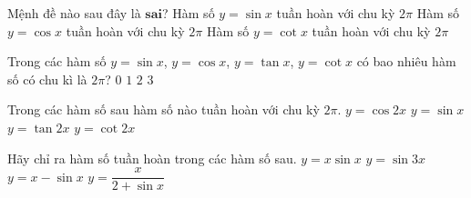 

\begin{ex}%
	Mệnh đề nào sau  đây là $\textbf{sai}$?
		{Hàm số $y=\sin x$  tuần hoàn với chu kỳ $2\pi$}
		{Hàm số  $y=\cos x$ tuần hoàn với chu kỳ $2\pi$}
		 {\True Hàm số $y=\cot x$ tuần hoàn với chu kỳ $2\pi$}
\end{ex}

\begin{ex}%
	Trong các hàm số $y=\sin x$, $y=\cos x$, $y=\tan x$, $y=\cot x$ có bao  nhiêu hàm số có chu kì là $2\pi$?
	\choice 
		 {$0$}
		{$1$} 
		{\True  $2$}
		{$3$} 
\end{ex}

\begin{ex}%
	Trong các hàm số sau hàm số nào tuần hoàn với chu kỳ $2\pi $. 
	 \choice
		{$y=  \cos 2x$}
		{\True  $y= \sin x$}
		{$y=  \tan 2x$}
		{$y= \cot  2x$}
\end{ex}

\begin{ex}%
	Hãy chỉ ra  hàm số tuần hoàn trong các hàm số sau.
	 \choice
		{$y=x\sin x$} 
		{\True  $y=\sin 3x$}
		{$y=x-\sin  x$}
		 {$y=\dfrac{x}{2+\sin x}$}
\end{ex}

